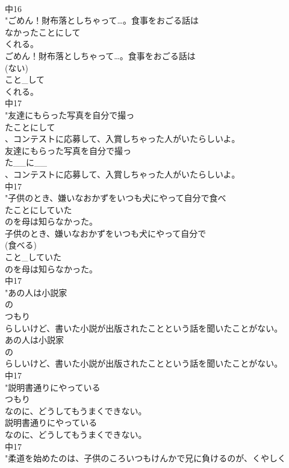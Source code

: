 \documentclass[8pt]{extreport}
\begin{document}
\begin{CJK}{UTF8}{min}
\\	中16
\\	"ごめん！財布落としちゃって…。食事をおごる話は
\\	なかったことにして
\\	くれる。
\\	ごめん！財布落としちゃって…。食事をおごる話は
\\	(ない)
\\	こと_して
\\	くれる。
\\	中17
\\	"友達にもらった写真を自分で撮っ
\\	たことにして
\\	、コンテストに応募して、入賞しちゃった人がいたらしいよ。
\\	友達にもらった写真を自分で撮っ
\\	た__に__
\\	、コンテストに応募して、入賞しちゃった人がいたらしいよ。
\\	中17
\\	"子供のとき、嫌いなおかずをいつも犬にやって自分で食べ
\\	たことにしていた
\\	のを母は知らなかった。
\\	子供のとき、嫌いなおかずをいつも犬にやって自分で
\\	(食べる)
\\	こと_していた
\\	のを母は知らなかった。
\\	中17
\\	"あの人は小説家
\\	の
\\	つもり
\\	らしいけど、書いた小説が出版されたことという話を聞いたことがない。
\\	あの人は小説家
\\	の
\\	らしいけど、書いた小説が出版されたことという話を聞いたことがない。
\\	中17
\\	"説明書通りにやっている
\\	つもり
\\	なのに、どうしてもうまくできない。
\\	説明書通りにやっている
\\	なのに、どうしてもうまくできない。
\\	中17
\\	"柔道を始めたのは、子供のころいつもけんかで兄に負けるのが、くやしく

\end{CJK}
\end{document}

